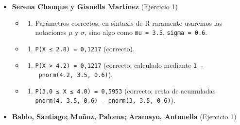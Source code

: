 \documentclass[
  spanish,
  letterpaper,
  DIV=11,
  numbers=noendperiod]{scrreprt}
\providecommand{\tightlist}{%
  \setlength{\itemsep}{0pt}\setlength{\parskip}{0pt}}
\begin{document}
\begin{itemize}
\item
  \textbf{Serena Chauque y Gianella Martínez} (Ejercicio 1)

  \begin{itemize}
  \tightlist
  \item
    \begin{enumerate}
    \def\labelenumi{\alph{enumi})}
    \tightlist
    \item
      Parámetros correctos; en sintaxis de R raramente usaremos las
      notaciones \(\mu\) y \(\sigma\), sino algo como
      \texttt{mu\ =\ 3.5}, \texttt{sigma\ =\ 0.6}.
    \end{enumerate}
  \item
    \begin{enumerate}
    \def\labelenumi{\alph{enumi})}
    \setcounter{enumi}{1}
    \tightlist
    \item
      \texttt{P(X\ ≤\ 2.8)\ =\ 0,1217} (correcto).
    \end{enumerate}
  \item
    \begin{enumerate}
    \def\labelenumi{\alph{enumi})}
    \setcounter{enumi}{2}
    \tightlist
    \item
      \texttt{P(X\ \textgreater{}\ 4.2)\ =\ 0,1217} (correcto; calculado
      mediante \texttt{1\ -\ pnorm(4.2,\ 3.5,\ 0.6)}).
    \end{enumerate}
  \item
    \begin{enumerate}
    \def\labelenumi{\alph{enumi})}
    \setcounter{enumi}{3}
    \tightlist
    \item
      \texttt{P(3.0\ ≤\ X\ ≤\ 4.0)\ =\ 0,5953} (correcto; resta de
      acumuladas
      \texttt{pnorm(4,\ 3.5,\ 0.6)\ -\ pnorm(3,\ 3.5,\ 0.6)}).
    \end{enumerate}
  \end{itemize}
\item
  \textbf{Baldo, Santiago; Muñoz, Paloma; Aramayo, Antonella} (Ejercicio
  1)


\end{itemize}
\end{document}
